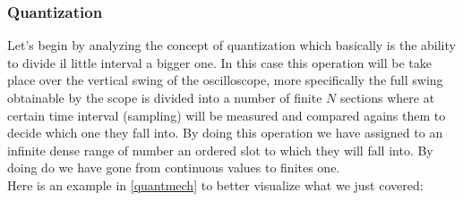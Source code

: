 \documentclass[../main.tex]{subfiles}
\begin{document}
\subsubsection{Quantization}

Let's begin by analyzing the concept of quantization which basically is the ability to divide il little interval a bigger one. In this case this operation will be take place over the vertical swing of the oscilloscope, more specifically the full swing obtainable by the scope is divided into a number of finite $N$ sections where at certain time interval (sampling) will be measured and compared agains them to decide which one they fall into. By doing this operation we have assigned to an infinite dense range of number an ordered slot to which they will fall into. By doing do we have gone from continuous values to finites one.\\

Here is an example in \autoref{quantmech} to better visualize what we just covered:
\end{document}
